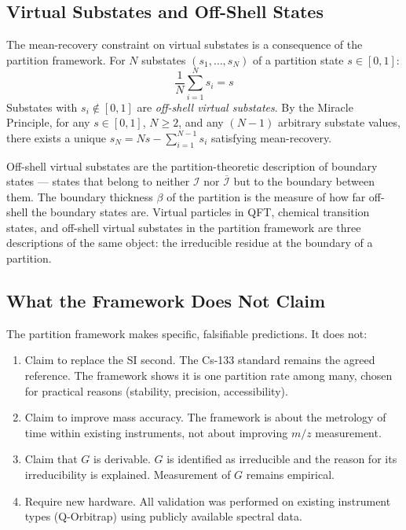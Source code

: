 \subsection{Virtual Substates and Off-Shell States}
\label{subsec:virtual}

The mean-recovery constraint on virtual substates is a consequence of the
partition framework. For $N$ substates $(s_1, \ldots, s_N)$ of a partition
state $s \in [0,1]$:
\begin{equation}
    \frac{1}{N}\sum_{i=1}^N s_i = s
    \label{eq:mean_recovery}
\end{equation}
Substates with $s_i \notin [0,1]$ are \emph{off-shell virtual substates}. By
the Miracle Principle, for any $s \in [0,1]$, $N \geq 2$, and any $(N-1)$
arbitrary substate values, there exists a unique $s_N = Ns - \sum_{i=1}^{N-1}
s_i$ satisfying mean-recovery.

Off-shell virtual substates are the partition-theoretic description of boundary
states --- states that belong to neither $\mathcal{I}$ nor $\overline{\mathcal{I}}$
but to the boundary between them. The boundary thickness $\beta$ of the
partition is the measure of how far off-shell the boundary states are. Virtual
particles in QFT, chemical transition states, and off-shell virtual substates in
the partition framework are three descriptions of the same object: the
irreducible residue at the boundary of a partition.

\subsection{What the Framework Does Not Claim}
\label{subsec:limits}

The partition framework makes specific, falsifiable predictions. It does not:
\begin{enumerate}
    \item Claim to replace the SI second. The Cs-133 standard remains the agreed
          reference. The framework shows it is one partition rate among many,
          chosen for practical reasons (stability, precision, accessibility).

    \item Claim to improve mass accuracy. The framework is about the metrology
          of time within existing instruments, not about improving $m/z$
          measurement.

    \item Claim that $G$ is derivable. $G$ is identified as irreducible and the
          reason for its irreducibility is explained. Measurement of $G$ remains
          empirical.

    \item Require new hardware. All validation was performed on existing
          instrument types (Q-Orbitrap) using publicly available spectral data.
\end{enumerate}
